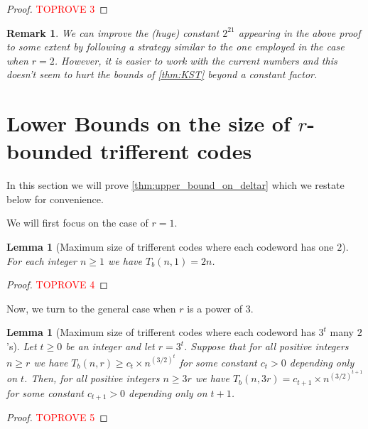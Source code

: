 \documentclass[10pt,a4paper]{article}
\newcommand{\rbdtrifferentcodes}{$r$-bounded trifferent code}
\newtheorem{lemma}[theorem]{Lemma}
\newtheorem{remark}[theorem]{Remark}
\DeclareMathOperator{\1}{\mathbf{1}}
\begin{document}
\begin{proof}\textcolor{red}{TOPROVE 3}\end{proof}

\begin{remark}
	We can improve the (huge) constant $2^{21}$ appearing in the above proof to some extent by following a strategy similar to the one employed in the case when $r=2$.
	However, it is easier to work with the current numbers and this doesn't seem to hurt the bounds of \cref{thm:KST} beyond a constant factor.
\end{remark}



\section{Lower Bounds on the size of \rbdtrifferentcodes{s}}
\label{sec:lower_bounds_rbdtrifferent_codes}

In this section we will prove \cref{thm:upper_bound_on_deltar}  which we restate below for convenience.

\upperboundondeltar*

We will first focus on the case of $r=1$.
\begin{lemma}[Maximum size of trifferent codes where each codeword has one $2$]
\label{lem:one_bounded_triff_codes}
    For each integer $n\geq 1$ we have $T_b(n,1)=2n$.
\end{lemma}
\begin{proof}\textcolor{red}{TOPROVE 4}\end{proof}



Now, we turn to the general case when $r$ is a power of $3$.
\begin{lemma}[Maximum size of trifferent codes where each codeword has $3^t$ many $2$'s]
	\label{lem:upper_bound_general_rbounded}
	Let $t\geq 0$ be an integer and let $r=3^t$. Suppose that for all positive integers $n\geq r$  we have $T_b(n,r) \geq c_t \times n^{(3/2)^t}$ for some constant $c_t>0$ depending only on $t$. Then, for all positive integers $n\geq 3r$ we have $T_b(n,3r) = c_{t+1}\times n^{(3/2)^{t+1}}$ for some constant $c_{t+1}>0$ depending only on $t+1$.
\end{lemma}




\begin{proof}\textcolor{red}{TOPROVE 5}\end{proof}
\end{document}
